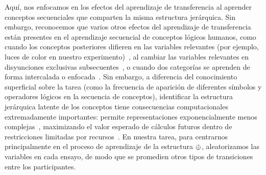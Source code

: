 Aquí, nos enfocamos en los efectos del aprendizaje de transferencia al aprender conceptos secuenciales que comparten la misma estructura jerárquica. Sin embargo, reconocemos que varios otros efectos del aprendizaje de transferencia están presentes en el aprendizaje secuencial de conceptos lógicos humanos, como cuando los conceptos posteriores difieren en las variables relevantes (por ejemplo, luces de color en nuestro experimento)~\cite{blair2009extremely}, al cambiar las variables relevantes en disyunciones exclusivas subsecuentes~\cite{kruschke1996dimensional}, o cuando dos categorías se aprenden de forma intercalada o enfocada~\cite{carvalho2014putting}. Sin embargo, a diferencia del conocimiento superficial sobre la tarea (como la frecuencia de aparición de diferentes símbolos y operadores lógicos en la secuencia de conceptos), identificar la estructura jerárquica latente de los conceptos tiene consecuencias computacionales extremadamente importantes: permite representaciones exponencialmente menos complejas~\cite{bengio2013representation,lake2015human}, maximizando el valor esperado de cálculos futuros dentro de restricciones limitadas por recursos~\cite{gershman2015computational}. En nuestra tarea, para centrarnos principalmente en el proceso de aprendizaje de la estructura $ \oplus $, aleatorizamos las variables en cada ensayo, de modo que se promedien otros tipos de transiciones entre los participantes.

